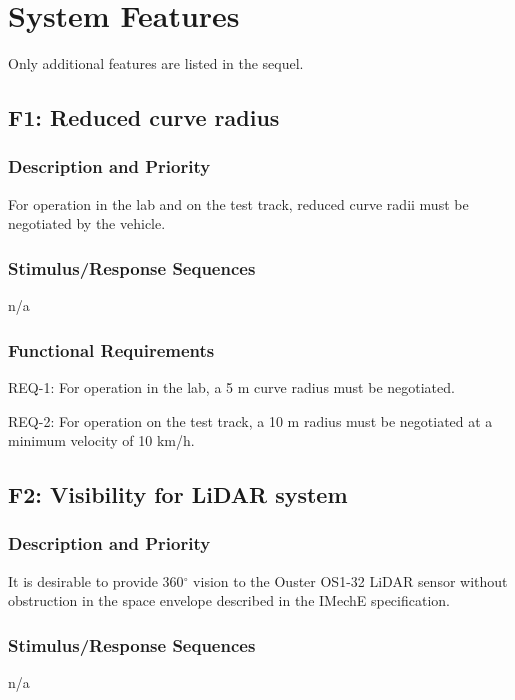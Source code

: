 \documentclass{scrreprt}
\begin{document}
\chapter{System Features}
Only additional features are listed in the sequel.
\section{F1: Reduced curve radius}

\subsection{Description and Priority}
For operation in the lab and on the test track, reduced curve radii must be negotiated by the vehicle.

\subsection{Stimulus/Response Sequences}
n/a

\subsection{Functional Requirements}


REQ-1: For operation in the lab, a 5 m curve radius must be negotiated.

REQ-2: For operation on the test track, a 10 m radius must be negotiated at a minimum velocity of 10 km/h.
\newpage
\section{F2: Visibility for LiDAR system}
\subsection{Description and Priority}
It is desirable to provide 360$^\circ$ vision to the Ouster OS1-32 LiDAR sensor without obstruction in the space envelope described in the IMechE specification.

\subsection{Stimulus/Response Sequences}
n/a
\end{document}
